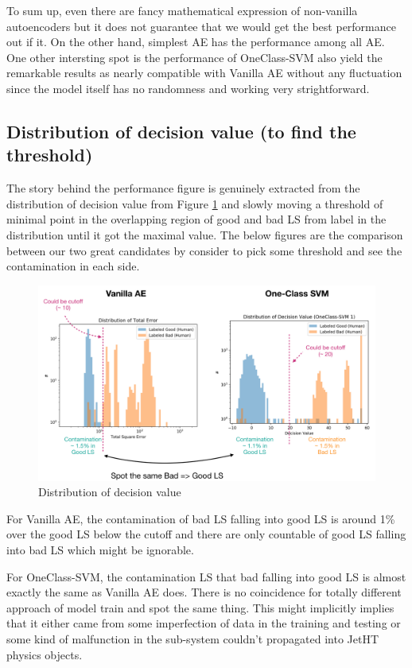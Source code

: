 To sum up, even there are fancy mathematical expression of non-vanilla autoencoders but it does not guarantee that we would get the best performance out if it. On the other hand, simplest AE has the performance among all AE. One other intersting spot is the performance of OneClass-SVM also yield the remarkable results as nearly compatible with Vanilla AE without any fluctuation since the model itself has no randomness and working very strightforward.

\subsection{Distribution of decision value (to find the threshold)}
The story behind the performance figure is genuinely extracted from the distribution of decision value from Figure \ref{fig:2016_decision_value_dist} and slowly moving a threshold of minimal point in the overlapping region of good and bad LS from label in the distribution until it got the maximal value. The below figures are the comparison between our two great candidates by consider to pick some threshold and see the contamination in each side.

\begin{figure}[h!]
    \centering
    \includegraphics[width=\textwidth]{images/reco/2016/decision_value_dist.png}
    \caption{Distribution of decision value}
    \label{fig:2016_decision_value_dist}
\end{figure}

For Vanilla AE, the contamination of bad LS falling into good LS is around 1\% over the good LS below the cutoff and there are only countable of good LS falling into bad LS which might be ignorable.

For OneClass-SVM, the contamination LS that bad falling into good LS is almost exactly the same as Vanilla AE does. There is no coincidence for totally different approach of model train and spot the same thing. This might implicitly implies that it either came from some imperfection of data in the training and testing or some kind of malfunction in the sub-system couldn't propagated into JetHT physics objects.

